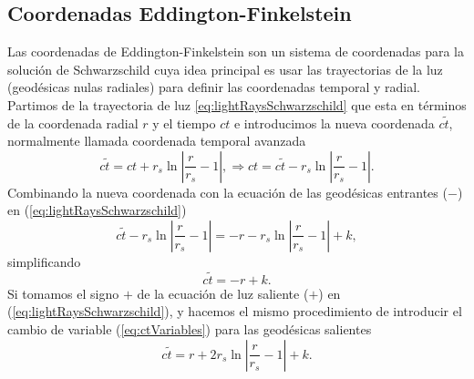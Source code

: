 \subsection{Coordenadas Eddington-Finkelstein}
Las coordenadas de Eddington-Finkelstein son un sistema de coordenadas para la solución de Schwarzschild cuya idea principal es usar las trayectorias de la luz (geodésicas nulas radiales) para definir las coordenadas temporal y radial.
Partimos de la trayectoria de luz \ref{eq:lightRaysSchwarzschild} que esta en términos de la coordenada radial \( r \) y el tiempo \( ct \) e introducimos la nueva coordenada \( c\tilde{t} \), normalmente llamada coordenada temporal avanzada
\begin{equation}
        c\tilde{t}  = ct + r_s \ln \left| \frac{r}{r_s} - 1 \right|,      \Rightarrow 
        ct         = c\tilde{t} - r_s \ln \left| \frac{r}{r_s} - 1 \right|.
    \label{eq:ctVariables}
\end{equation}
Combinando la nueva coordenada con la ecuación de las geodésicas entrantes (\( - \)) en (\ref{eq:lightRaysSchwarzschild})
\begin{equation}
    c\tilde{t} - r_s \ln \left| \frac{r}{r_s} - 1 \right| = -r - r_s \ln \left| \frac{r}{r_s} - 1 \right| + k,
\end{equation}
simplificando 
\begin{equation}
    c\tilde{t} = -r + k  .
\label{eq:ctVariablesIn}
\end{equation}
Si tomamos el signo \( + \) de la ecuación de luz saliente (\( + \)) en (\ref{eq:lightRaysSchwarzschild}), y hacemos el mismo procedimiento de introducir el cambio de variable (\ref{eq:ctVariables}) para las geodésicas salientes
\begin{equation}
    c\tilde{t} = r + 2 r_s \ln \left| \frac{r}{r_s} - 1 \right| + k.
\end{equation}


